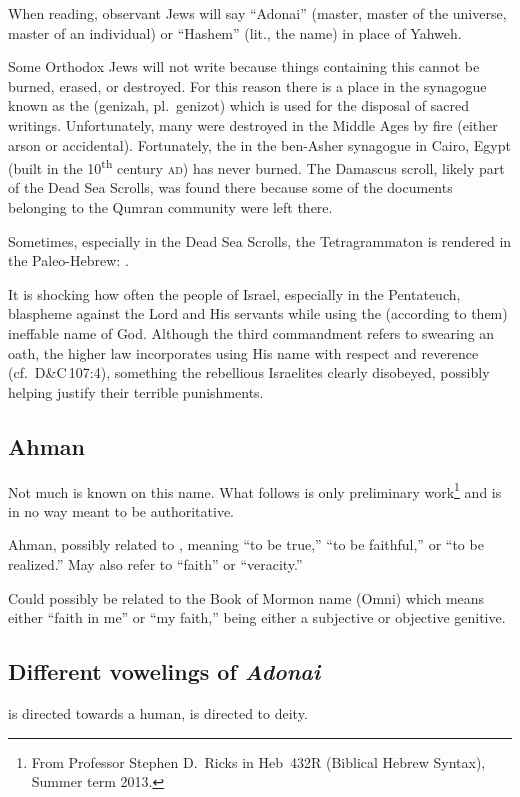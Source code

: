 When reading, observant Jews will say ``Adonai'' (master, master of the universe, master of an individual) or ``Hashem'' (lit., the name) in place of Yahweh.

Some Orthodox Jews will not write  because things containing this cannot be burned, erased, or destroyed. For this reason there is a place in the synagogue known as the  (genizah, pl.\ genizot) which is used for the disposal of sacred writings. Unfortunately, many  were destroyed in the Middle Ages by fire (either arson or accidental). Fortunately, the  in the ben-Asher synagogue in Cairo, Egypt (built in the 10\textsuperscript{th} century \textsc{ad}) has never burned. The Damascus scroll, likely part of the Dead Sea Scrolls, was found there because some of the documents belonging to the Qumran community were left there.

Sometimes, especially in the Dead Sea Scrolls, the Tetragrammaton is rendered in the Paleo-Hebrew: .

It is shocking how often the people of Israel, especially in the Pentateuch, blaspheme against the Lord and His servants while using the (according to them) ineffable name of God. Although the third commandment refers to swearing an oath, the higher law incorporates using His name with respect and reverence (cf.~D\&C\,107:4), something the rebellious Israelites clearly disobeyed, possibly helping justify their terrible punishments.

\subsection{Ahman}
Not much is known on this name. What follows is only preliminary work\footnote{From Professor Stephen D.\ Ricks in Heb~432R (Biblical Hebrew Syntax), Summer term 2013.} and is in no way meant to be authoritative.

Ahman, possibly related to , meaning ``to be true,'' ``to be faithful,'' or ``to be realized.'' May also refer to ``faith'' or ``veracity.''

Could possibly be related to the Book of Mormon name  (Omni) which means either ``faith in me'' or ``my faith,''  being either a subjective or objective genitive.

\subsection{Different vowelings of \textit{Adonai}}\label{app:adonai}
 is directed towards a human,  is directed to deity.
